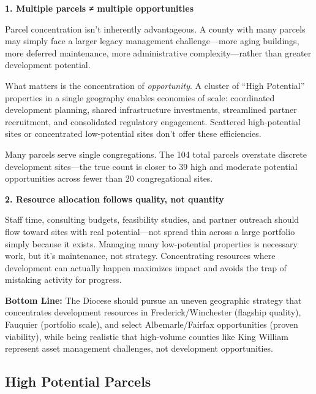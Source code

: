 \documentclass[
  letterpaper,
  DIV=11,
  numbers=noendperiod,
  oneside]{scrreprt}
\begin{document}
\textbf{1. Multiple parcels ≠ multiple opportunities}

Parcel concentration isn't inherently advantageous. A county with many
parcels may simply face a larger legacy management challenge---more
aging buildings, more deferred maintenance, more administrative
complexity---rather than greater development potential.

What matters is the concentration of \emph{opportunity}. A cluster of
``High Potential'' properties in a single geography enables economies of
scale: coordinated development planning, shared infrastructure
investments, streamlined partner recruitment, and consolidated
regulatory engagement. Scattered high-potential sites or concentrated
low-potential sites don't offer these efficiencies.

Many parcels serve single congregations. The 104 total parcels overstate
discrete development sites---the true count is closer to 39 high and
moderate potential opportunities across fewer than 20 congregational
sites.

\textbf{2. Resource allocation follows quality, not quantity}

Staff time, consulting budgets, feasibility studies, and partner
outreach should flow toward sites with real potential---not spread thin
across a large portfolio simply because it exists. Managing many
low-potential properties is necessary work, but it's maintenance, not
strategy. Concentrating resources where development can actually happen
maximizes impact and avoids the trap of mistaking activity for progress.

\textbf{Bottom Line:} The Diocese should pursue an uneven geographic
strategy that concentrates development resources in Frederick/Winchester
(flagship quality), Fauquier (portfolio scale), and select
Albemarle/Fairfax opportunities (proven viability), while being
realistic that high-volume counties like King William represent asset
management challenges, not development opportunities.

\subsection{High Potential Parcels}\label{high-potential-parcels}
\end{document}
